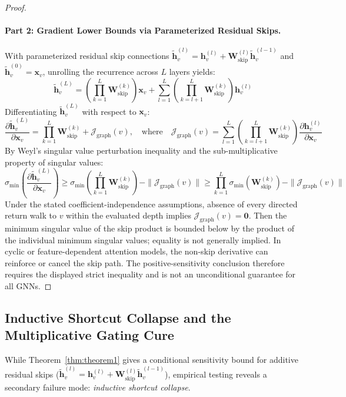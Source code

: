 \begin{proof}
\paragraph{Part 2: Gradient Lower Bounds via Parameterized Residual Skips.}
With parameterized residual skip connections $\tilde{\mathbf{h}}_v^{(l)} = \mathbf{h}_v^{(l)} + \mathbf{W}_{\text{skip}}^{(l)} \tilde{\mathbf{h}}_v^{(l-1)}$ and $\tilde{\mathbf{h}}_v^{(0)} = \mathbf{x}_v$, unrolling the recurrence across $L$ layers yields:
\begin{equation}
\tilde{\mathbf{h}}_v^{(L)} = \left( \prod_{k=1}^L \mathbf{W}_{\text{skip}}^{(k)} \right) \mathbf{x}_v + \sum_{l=1}^L \left( \prod_{k=l+1}^L \mathbf{W}_{\text{skip}}^{(k)} \right) \mathbf{h}_v^{(l)}
\end{equation}
Differentiating $\tilde{\mathbf{h}}_v^{(L)}$ with respect to $\mathbf{x}_v$:
\begin{equation}
\frac{\partial \tilde{\mathbf{h}}_v^{(L)}}{\partial \mathbf{x}_v} = \prod_{k=1}^L \mathbf{W}_{\text{skip}}^{(k)} + \mathcal{J}_{\text{graph}}(v), \quad \text{where} \quad \mathcal{J}_{\text{graph}}(v) = \sum_{l=1}^L \left( \prod_{k=l+1}^L \mathbf{W}_{\text{skip}}^{(k)} \right) \frac{\partial \mathbf{h}_v^{(l)}}{\partial \mathbf{x}_v}
\end{equation}
By Weyl's singular value perturbation inequality and the sub-multiplicative property of singular values:
\begin{equation}
\sigma_{\min} \left( \frac{\partial \tilde{\mathbf{h}}_v^{(L)}}{\partial \mathbf{x}_v} \right) \ge \sigma_{\min} \left( \prod_{k=1}^L \mathbf{W}_{\text{skip}}^{(k)} \right) - \|\mathcal{J}_{\text{graph}}(v)\| \ge \prod_{k=1}^L \sigma_{\min}(\mathbf{W}_{\text{skip}}^{(k)}) - \|\mathcal{J}_{\text{graph}}(v)\|
\end{equation}
Under the stated coefficient-independence assumptions, absence of every directed return walk to $v$ within the evaluated depth implies $\mathcal{J}_{\text{graph}}(v)=\mathbf{0}$. Then the minimum singular value of the skip product is bounded below by the product of the individual minimum singular values; equality is not generally implied. In cyclic or feature-dependent attention models, the non-skip derivative can reinforce or cancel the skip path. The positive-sensitivity conclusion therefore requires the displayed strict inequality and is not an unconditional guarantee for all GNNs.
\end{proof}

\subsection{Inductive Shortcut Collapse and the Multiplicative Gating Cure}
While Theorem~\ref{thm:theorem1} gives a conditional sensitivity bound for additive residual skips ($\tilde{\mathbf{h}}_v^{(l)} = \mathbf{h}_v^{(l)} + \mathbf{W}_{\text{skip}}^{(l)} \tilde{\mathbf{h}}_v^{(l-1)}$), empirical testing reveals a secondary failure mode: \textit{inductive shortcut collapse}.

